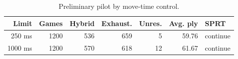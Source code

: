 \begin{table}[h]
\centering
\caption{Preliminary pilot by move-time control.}
\label{tab:pilot-detail}
\scriptsize
\begin{tabular}{rrrrrrl}
\toprule
Limit & Games & Hybrid & Exhaust. & Unres. & Avg. ply & SPRT \\
\midrule
250 ms & 1200 & 536 & 659 & 5 & 59.76 & continue \\
1000 ms & 1200 & 570 & 618 & 12 & 61.67 & continue \\
\bottomrule
\end{tabular}
\end{table}
